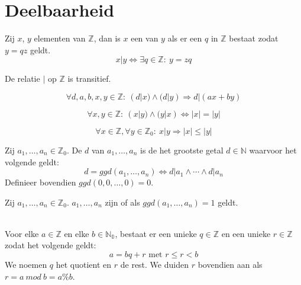 \documentclass[main.tex]{subfiles}
\begin{document}
\chapter{Deelbaarheid}
\label{cha:deelbaarheid}

\begin{de}
  \label{de:deler}
  Zij $x$, $y$ elementen van $\mathbb{Z}$, dan is $x$ een  van $y$ als er een $q$ in $\mathbb{Z}$ bestaat zodat $y = qz$ geldt.
  \[ x | y \Leftrightarrow \exists q \in \mathbb{Z}:\ y= zq \]
\end{de}

\begin{ei}
  De relatie $|$ op $\mathbb{Z}$ is transitief.

\end{ei}

\begin{ei}
  \[ \forall d,a,b,x,y \in \mathbb{Z}:\ (d|x) \wedge (d|y) \Rightarrow d|(ax + by) \]

\end{ei}

\begin{ei}
  \[ \forall x,y \in \mathbb{Z}:\ (x|y) \wedge (y|x) \Leftrightarrow |x| = |y| \]

\end{ei}

\begin{ei}
  \[ \forall x \in \mathbb{Z}, \forall y \in \mathbb{Z}_{0}:\ x|y \Rightarrow |x| \le |y| \]

\end{ei}

\begin{de}
  Zij $a_{1},\dotsc,a_{n} \in \mathbb{Z}_{0}$. De  $d$ van $a_{1},\dotsc,a_{n}$ is de het grootste getal $d \in \mathbb{N}$ waarvoor het volgende geldt:
  \[ d = ggd(a_{1},\dotsc,a_{n}) \Leftrightarrow d|a_{1} \wedge \dotsb \wedge d|a_{n}\]
  Definieer bovendien $ggd(0,0,\dotsc,0) = 0$.   
\end{de}

\begin{de}
  Zij $a_{1},\dotsc,a_{n} \in \mathbb{Z}_{0}$.
  $a_{1},\dotsc,a_{n}$ zijn  of  als $ggd(a_{1},\dotsc,a_{n}) = 1$ geldt.
\end{de}

\begin{st}
  \label{st:euclidische-deling}
  \\
  Voor elke $a \in \mathbb{Z}$ en elke $b \in \mathbb{N_{0}}$, bestaat er een unieke $q\in \mathbb{Z}$ en een unieke $r\in \mathbb{Z}$ zodat het volgende geldt:
  \[ a = bq + r \text{ met } r \le r < b \]
  We noemen $q$ het quotient en $r$ de rest.
  We duiden $r$ bovendien aan als $r = a\ mod\ b = a\%b$.

\end{st}
\end{document}
